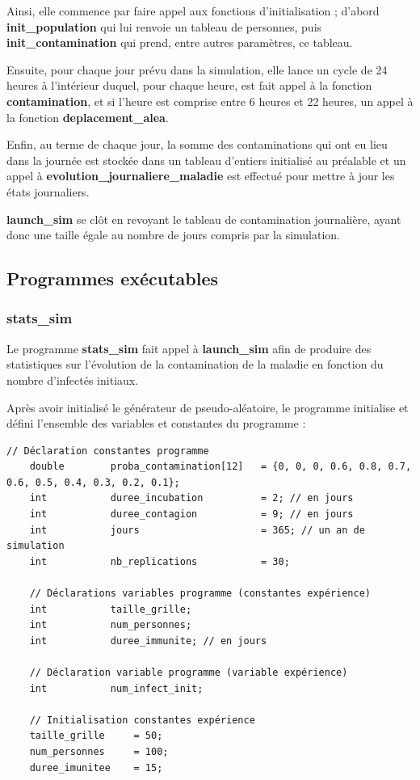 \documentclass[12pt,french,titlepage]{article}
\begin{document}
Ainsi, elle commence par faire appel aux fonctions d'initialisation ; d'abord \textbf{init\_population} qui lui renvoie un tableau de personnes, puis \textbf{init\_contamination} qui prend, entre autres paramètres, ce tableau.

Ensuite, pour chaque jour prévu dans la simulation, elle lance un cycle de 24 heures à l'intérieur duquel, pour chaque heure, est fait appel à la fonction \textbf{contamination}, et si l'heure est comprise entre 6 heures et 22 heures, un appel à la fonction \textbf{deplacement\_alea}.

Enfin, au terme de chaque jour, la somme des contaminations qui ont eu lieu dans la journée est stockée dans un tableau d'entiers initialisé au préalable et un appel à  \textbf{evolution\_journaliere\_maladie} est effectué pour mettre à jour les états journaliers.

\textbf{launch\_sim} se clôt en revoyant le tableau de contamination journalière, ayant donc une taille égale au nombre de jours compris par la simulation.

\newpage

\subsection{Programmes exécutables}
\subsubsection{stats\_sim}
\label{sec:stats_sim}
Le programme \textbf{stats\_sim} fait appel à \textbf{launch\_sim} afin de produire des statistiques sur l'évolution de la contamination de la maladie en fonction du nombre d'infectés initiaux.

Après avoir initialisé le générateur de pseudo-aléatoire, le programme initialise et défini l'ensemble des variables et constantes du programme :
\begin{lstlisting}
// Déclaration constantes programme
    double        proba_contamination[12]   = {0, 0, 0, 0.6, 0.8, 0.7, 0.6, 0.5, 0.4, 0.3, 0.2, 0.1};
    int           duree_incubation          = 2; // en jours
    int           duree_contagion           = 9; // en jours
    int           jours                     = 365; // un an de simulation
    int           nb_replications           = 30;

    // Déclarations variables programme (constantes expérience)
    int           taille_grille;
    int           num_personnes;
    int           duree_immunite; // en jours

    // Déclaration variable programme (variable expérience)
    int           num_infect_init;
    
    // Initialisation constantes expérience
    taille_grille     = 50;
    num_personnes     = 100;
    duree_imunitee    = 15;
\end{lstlisting}
\end{document}

